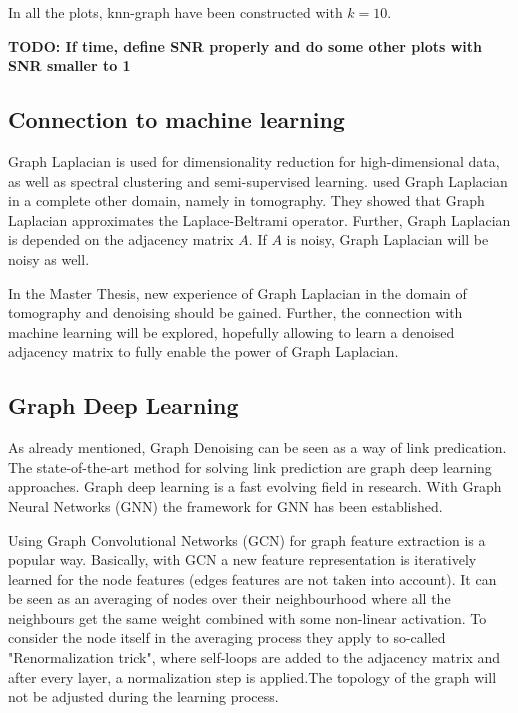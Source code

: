 In all the plots, knn-graph have been constructed with $k=10$. 

\textbf{TODO: If time, define SNR properly and do some other plots with SNR smaller to 1}

\subsection{Connection to machine learning}

Graph Laplacian is used for dimensionality reduction for high-dimensional data, as well as spectral clustering and semi-supervised learning.
\citet{LaplaceRandomProjections} used Graph Laplacian in a complete other domain, namely in tomography. 
They showed that Graph Laplacian approximates the Laplace-Beltrami operator.
Further, Graph Laplacian is depended on the adjacency matrix $A$. 
If $A$ is noisy, Graph Laplacian will be noisy as well.


\begin{tcolorbox}[colback=red!5!white,colframe=red!75!black]
    In the Master Thesis, new experience of Graph Laplacian in the domain of tomography and denoising
    should be gained. Further, the connection with machine learning will be explored, hopefully allowing to learn a denoised 
    adjacency matrix to fully enable the power of Graph Laplacian.
\end{tcolorbox}


\subsection{Graph Deep Learning}
As already mentioned, Graph Denoising can be seen as a way of link predication. 
The state-of-the-art method for solving link prediction are graph deep learning approaches.
Graph deep learning is a fast evolving field in research. With Graph Neural Networks (GNN)\cite{GNN} the framework
for GNN has been established. 

Using Graph Convolutional Networks (GCN) \cite{GCN} for graph feature extraction is a popular way. 
Basically, with GCN a new feature representation is iteratively learned for the node features (edges features are not taken into account).
It can be seen as an averaging of nodes over their neighbourhood where all the neighbours get the same weight combined with some non-linear activation. 
To consider the node itself in the averaging process they apply to so-called "Renormalization trick", where self-loops are added to the 
adjacency matrix and after every layer, a normalization step is applied.The topology of the graph will not be adjusted during the learning process.

